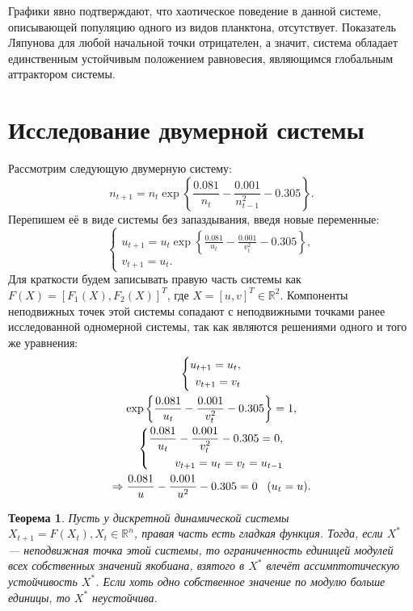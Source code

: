 \documentclass[11pt]{article}
\newtheorem{theorem}{Теорема}
\begin{document}
Графики явно подтверждают, что хаотическое поведение в данной системе, описывающей популяцию одного из видов планктона, отсутствует. Показатель Ляпунова для любой начальной точки отрицателен, а значит, система обладает единственным устойчивым положением равновесия, являющимся глобальным аттрактором системы.
\pagebreak
\section{Исследование двумерной системы}
Рассмотрим следующую двумерную систему:
$$
n_{t+1} = n_t \exp{ \left\{ \frac{0.081}{n_t} - \frac{0.001}{n_{t-1}^2} - 0.305 \right\} }.
$$
Перепишем её в виде системы без запаздывания, введя новые переменные:
$$
\left\{
\begin{aligned}
u_{t+1} = u_t \exp{ \left\{ \frac{0.081}{u_t} - \frac{0.001}{v_t^2} - 0.305 \right\} }, \\
v_{t+1} = u_t.
\end{aligned}
\right.
$$
Для краткости будем записывать правую часть системы как $F(X) = [F_1(X), F_2(X)]^T$, где $X = [u, v]^T \in \mathbb{R}^2$. Компоненты неподвижных точек этой системы сопадают с неподвижными точками ранее исследованной одномерной системы, так как являются решениями одного и того же уравнения:
\begin{gather}
\left\{ \begin{aligned}
u_{t+1} = u_t, \\
v_{t+1} = v_t
\end{aligned} \right. \notag \\
\exp{ \left\{ \frac{0.081}{u_t} - \frac{0.001}{v_t^2} - 0.305 \right\} } = 1, \notag \\
\left\{ \begin{aligned}
\frac{0.081}{u_t} - \frac{0.001}{v_t^2} - 0.305 = 0, \\
v_{t+1} = u_t = v_t = u_{t-1}
\end{aligned} \right. \notag \\
\Rightarrow \frac{0.081}{u} - \frac{0.001}{u^2} - 0.305 = 0 \; \; \; (u_t = u). \notag
\end{gather}
\begin{theorem}
Пусть у дискретной динамической системы $X_{t+1} = F(X_t), X_t \in  \mathbb{R}^n$, правая часть есть гладкая функция. Тогда, если $X^*$ --- неподвижная точка этой системы, то ограниченность единицей модулей всех собственных значений якобиана, взятого в $X^*$ влечёт ассимптотическую устойчивость $X^*$. Если хоть одно собственное значение по модулю больше единицы, то $X^*$ неустойчива.
\end{theorem}
\end{document}
